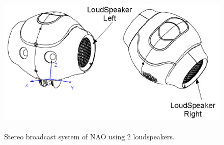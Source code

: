 \begin{figure}
	[h] \centering 
	\includegraphics[height=7cm]{figures/content/nao-audio.jpg} \caption{Stereo broadcast system of NAO using 2 loudspeakers. \cite{nao-spec}} \label{fg:nao:audio} 
\end{figure}
